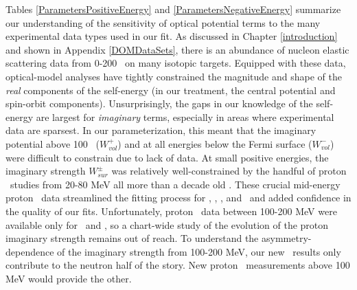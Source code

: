 Tables \ref{ParametersPositiveEnergy} and \ref{ParametersNegativeEnergy}
summarize our understanding of the
sensitivity of optical potential terms to the many experimental data types
used in our fit. As discussed in Chapter \ref{introduction} and shown in
Appendix \ref{DOMDataSets}, there is an abundance of nucleon elastic scattering data
from 0-200 \mega\electronvolt\ on many isotopic targets. Equipped with these data, optical-model 
analyses have tightly constrained the magnitude and shape of the \textit{real}
components of the self-energy (in our treatment, the central potential
and spin-orbit components). Unsurprisingly, the gaps in our knowledge of the self-energy are
largest for \textit{imaginary} terms, especially in areas where experimental
data are sparsest.
In our parameterization, this meant that the imaginary potential
above 100 \mega\electronvolt\ ($W_{vol}^{+}$) and at all
energies below the Fermi surface ($W_{vol}^{-}$) were difficult to constrain due
to lack of data. At small positive energies, the imaginary strength
$W_{sur}^{\pm}$ was relatively well-constrained by the handful of proton
\rxn\ studies from 20-80 MeV all more than a decade old \cite{Carlson75,
Slaus1975, Ingemarsson1999, Auce05}. These crucial mid-energy
proton \rxn\ data streamlined the fitting
process for \oSix, \caAughtEight, \niEight, and \pbEight\ and added confidence
in the quality of our fits.
Unfortunately, proton \rxn\ data between 100-200 MeV were available
only for \caForty\ and \pbEight, so a chart-wide study of the evolution
of the proton imaginary strength remains out of reach. To understand the
asymmetry-dependence of the imaginary strength from 100-200 MeV, our new \tot\
results only contribute to the neutron half of the story. New proton \rxn\
measurements above 100 MeV would provide the other.

